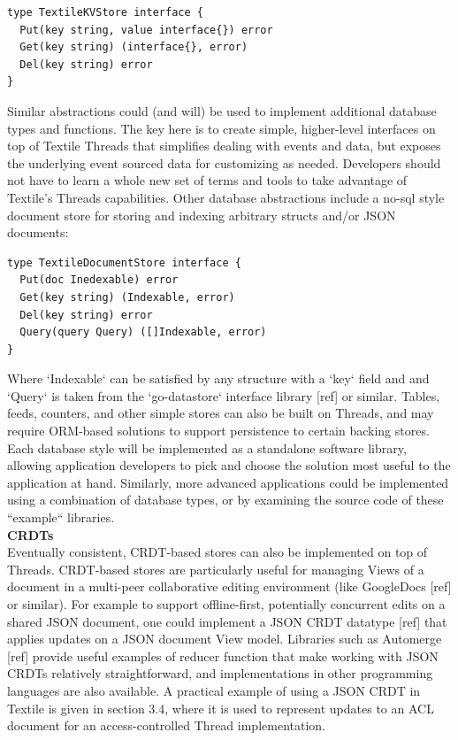 \documentclass{comjnl}
\begin{document}
\begin{lstlisting}
type TextileKVStore interface {
  Put(key string, value interface{}) error
  Get(key string) (interface{}, error)
  Del(key string) error
}
\end{lstlisting}

Similar abstractions could (and will) be used to implement additional database types and functions. The key here is to create simple, higher-level interfaces on top of Textile Threads that simplifies dealing with events and data, but exposes the underlying event sourced data for customizing as needed. Developers should not have to learn a whole new set of terms and tools to take advantage of Textile’s Threads capabilities. Other database abstractions include a no-sql style document store for storing and indexing arbitrary structs and/or JSON documents:

\begin{lstlisting}
type TextileDocumentStore interface {
  Put(doc Inedexable) error
  Get(key string) (Indexable, error)
  Del(key string) error
  Query(query Query) ([]Indexable, error)
}
\end{lstlisting}

Where `Indexable` can be satisfied by any structure with a  `key` field and and `Query` is taken from the `go-datastore` interface library [ref] or similar. Tables, feeds, counters, and other simple stores can also be built on Threads, and may require ORM-based solutions to support persistence to certain backing stores. Each database style will be implemented as a standalone software library, allowing application developers to pick and choose the solution most useful to the application at hand. Similarly, more advanced applications could be implemented using a combination of database types, or by examining the source code of these “example“ libraries.\\

\textbf{CRDTs} \\

Eventually consistent, CRDT-based stores can also be implemented on top of Threads. CRDT-based stores are particularly useful for managing Views of a document in a multi-peer collaborative editing environment (like GoogleDocs [ref] or similar). For example to support offline-first, potentially concurrent edits on a shared JSON document, one could implement a JSON CRDT datatype [ref] that applies updates on a JSON document View model. Libraries such as Automerge [ref] provide useful examples of reducer function that make working with JSON CRDTs relatively straightforward, and implementations in other programming languages are also available. A practical example of using a JSON CRDT in Textile is given in section 3.4, where it is used to represent updates to an ACL document for an access-controlled Thread implementation.\\
\end{document}
